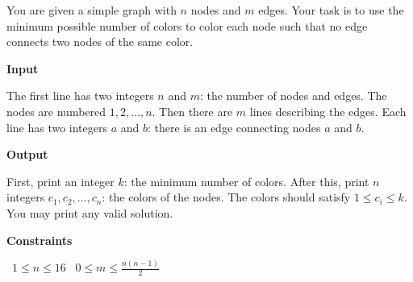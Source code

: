 You are given a simple graph with $n$ nodes and $m$ edges. Your task is to use the minimum possible number of colors to color each node such that no edge connects two nodes of the same color.

\vspace{0.3cm}\noindent\textbf{Input}

The first line has two integers $n$ and $m$: the number of nodes and edges. The nodes are numbered $1, 2,\dots, n$.
Then there are $m$ lines describing the edges. Each line has two integers $a$ and $b$: there is an edge connecting nodes $a$ and $b$.

\vspace{0.3cm}\noindent\textbf{Output}

First, print an integer $k$: the minimum number of colors.
After this, print $n$ integers $c_1, c_2,\dots, c_n$: the colors of the nodes. The colors should satisfy $1 \le c_i \le k$.
You may print any valid solution.

\vspace{0.3cm}\noindent\textbf{Constraints}

\textbullet\ $1 \le n \le 16$
\textbullet\ $0 \le m \le \frac{n(n-1)}{2}$
